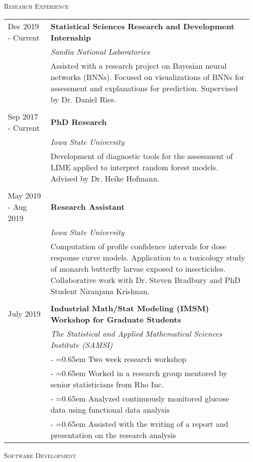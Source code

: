 \documentclass[10pt, oneside]{article}
\begin{document}
\noindent \textsc{Research Experience} \hrulefill

\begin{longtable}{p{3.5cm}p{13cm}}
\hfill{Dec 2019 - Current} & \textbf{Statistical Sciences Research and Development Internship}\\
& \emph{Sandia National Laboratories}\\
& Assisted with a research project on Bayesian neural networks (BNNs). Focused on visualizations of BNNs for assessment and explanations for prediction. Supervised by Dr. Daniel Ries.\\
\\
\hfill{Sep 2017 - Current} & \textbf{PhD Research}\\
& \emph{Iowa State University}\\
& Development of diagnostic tools for the assessment of LIME applied to interpret random forest models. Advised by Dr. Heike Hofmann.\\
\\
\hfill{May 2019 - Aug 2019} & \textbf{Research Assistant}\\
& \emph{Iowa State University}\\
& Computation of profile confidence intervals for dose response curve models. Application to a toxicology study of monarch butterfly larvae exposed to insecticides. Collaborative work with Dr. Steven Bradbury and PhD Student Niranjana Krishnan.\\
\\
\hfill{July 2019} & \textbf{Industrial Math/Stat Modeling (IMSM) Workshop for Graduate Students}\\
& \emph{The Statistical and Applied Mathematical Sciences Institute (SAMSI)} \vspace{0.1cm}\\
& - \hangindent=0.65em \hangafter=1 Two week research workshop\\
& - \hangindent=0.65em \hangafter=1 Worked in a research group mentored by senior statisticians from Rho Inc.\\
& - \hangindent=0.65em \hangafter=1 Analyzed continuously monitored glucose data using functional data analysis\\
& - \hangindent=0.65em \hangafter=1 Assisted with the writing of a report and presentation on the research analysis\\
\end{longtable}

\noindent \textsc{Software Development} \hrulefill
\end{document}
